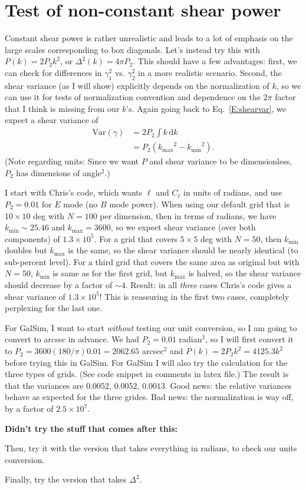 \documentclass[preprint]{aastex}
\newcommand{\kmax}{\ensuremath{k_\mathrm{max}}}
\newcommand{\kmin}{\ensuremath{k_\mathrm{min}}}
\newcommand{\rmd}{\ensuremath{\mathrm{d}}}
\begin{document}
\section{Test of non-constant shear power}

Constant shear power is rather unrealistic and leads to a lot of
emphasis on the large scales corresponding to box diagonals.  Let's
instead try this with $P(k) = 2 P_2 k^2$, or $\Delta^2(k) =
4 \pi P_2$.  This should have a few advantages: first, we can check
for differences in $\gamma_1^2$ vs. $\gamma_2^2$ in a more realistic
scenario.  Second, the shear variance (as I will show) explicitly
depends on the normalization of $k$, so we can use it for tests of
normalization convention and dependence on the $2\pi$ factor that I
think is missing from our $k$'s. Again going back to Eq.~\ref{E:shearvar},
we expect a shear variance of
\begin{align}
\mathrm{Var}(\gamma) &= 2 P_2 \int k\,\rmd k\\
 &= P_2 (\kmax^2-\kmin^2).
\end{align}
(Note regarding units: Since we want $P$ and shear variance to be dimensionless, $P_2$
has dimensions of angle$^2$.)

I start with Chris's code, which wants $\ell$ and $C_\ell$ in units of
radians, and use $P_2=0.01$ for $E$ mode (no $B$ mode power).  When
using our default grid that is $10\times 10$ deg with $N=100$ per
dimension, then in terms of radians, we have $\kmin\sim 25.46$ and
$\kmax=3600$, so we expect shear variance (over both components) of
$1.3\times 10^5$.  For a grid that covers $5\times 5$ deg with $N=50$,
then $\kmin$ doubles but $\kmax$ is the same, so the shear variance
should be nearly identical (to sub-percent level).  For a third grid
that covers the same area as original but with $N=50$, $\kmin$ is same
as for the first grid, but $\kmax$ is halved, so the shear variance
should decrease by a factor of $\sim 4$.  Result: in all {\em three}
cases Chris's code gives a shear variance of $1.3\times 10^5$!  This
is reassuring in the first two cases, completely perplexing for the
last one.

For GalSim, I want to start {\em without} testing our unit conversion,
so I am going to convert to arcsec in advance.  We had $P_2=0.01$
radian$^2$, so I will first convert it to
$P_2=3600(180/\pi)0.01=2062.65$ arcsec$^2$ and $P(k)=2 P_2 k^2 = 4125.3
k^2$ before trying this in
GalSim.  For GalSim I will also try the calculation for the three
types of grids. (See code snippet in comments in latex file.)
The result is that the variances are $0.0052$, $0.0052$, $0.0013$.
Good news: the relative variances behave as expected for the three
grides.  Bad news: the normalization is way off, by a factor of
$2.5\times 10^7$.

\textbf{Didn't try the stuff that comes after this:}

Then, try it with the version that takes everything in radians, to
check our units conversion.

Finally, try the version that takes $\Delta^2$.
\end{document}
